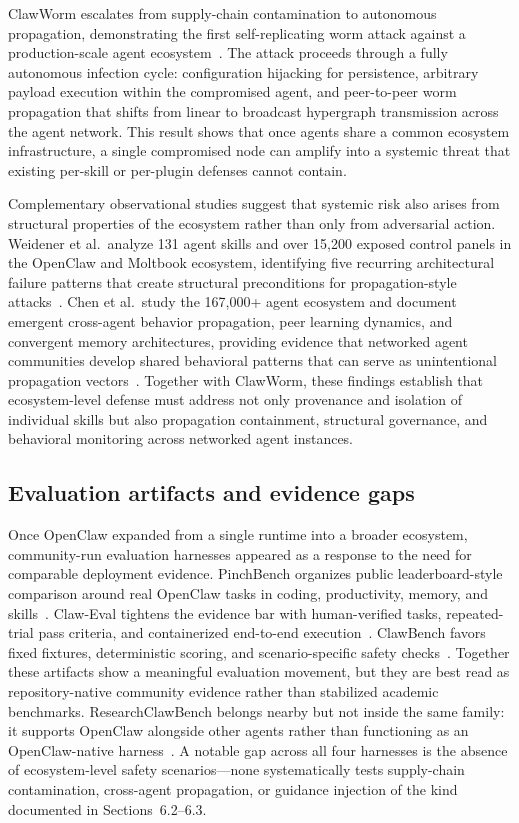 ClawWorm escalates from supply-chain contamination to autonomous propagation, demonstrating the first self-replicating worm attack against a production-scale agent ecosystem~\cite{clawworm2026}. The attack proceeds through a fully autonomous infection cycle: configuration hijacking for persistence, arbitrary payload execution within the compromised agent, and peer-to-peer worm propagation that shifts from linear to broadcast hypergraph transmission across the agent network. This result shows that once agents share a common ecosystem infrastructure, a single compromised node can amplify into a systemic threat that existing per-skill or per-plugin defenses cannot contain.

Complementary observational studies suggest that systemic risk also arises from structural properties of the ecosystem rather than only from adversarial action. Weidener et al.\ analyze 131 agent skills and over 15,200 exposed control panels in the OpenClaw and Moltbook ecosystem, identifying five recurring architectural failure patterns that create structural preconditions for propagation-style attacks~\cite{agentsocialnetworks2026}. Chen et al.\ study the 167,000+ agent ecosystem and document emergent cross-agent behavior propagation, peer learning dynamics, and convergent memory architectures, providing evidence that networked agent communities develop shared behavioral patterns that can serve as unintentional propagation vectors~\cite{openclawlearn2026}. Together with ClawWorm, these findings establish that ecosystem-level defense must address not only provenance and isolation of individual skills but also propagation containment, structural governance, and behavioral monitoring across networked agent instances.

\subsection{Evaluation artifacts and evidence gaps}

Once OpenClaw expanded from a single runtime into a broader ecosystem, community-run evaluation harnesses appeared as a response to the need for comparable deployment evidence. PinchBench organizes public leaderboard-style comparison around real OpenClaw tasks in coding, productivity, memory, and skills~\cite{pinchbench2026}. Claw-Eval tightens the evidence bar with human-verified tasks, repeated-trial pass criteria, and containerized end-to-end execution~\cite{claweval2026}. ClawBench favors fixed fixtures, deterministic scoring, and scenario-specific safety checks~\cite{clawbench2026}. Together these artifacts show a meaningful evaluation movement, but they are best read as repository-native community evidence rather than stabilized academic benchmarks. ResearchClawBench belongs nearby but not inside the same family: it supports OpenClaw alongside other agents rather than functioning as an OpenClaw-native harness~\cite{researchclawbench2026}. A notable gap across all four harnesses is the absence of ecosystem-level safety scenarios---none systematically tests supply-chain contamination, cross-agent propagation, or guidance injection of the kind documented in Sections~6.2--6.3.

